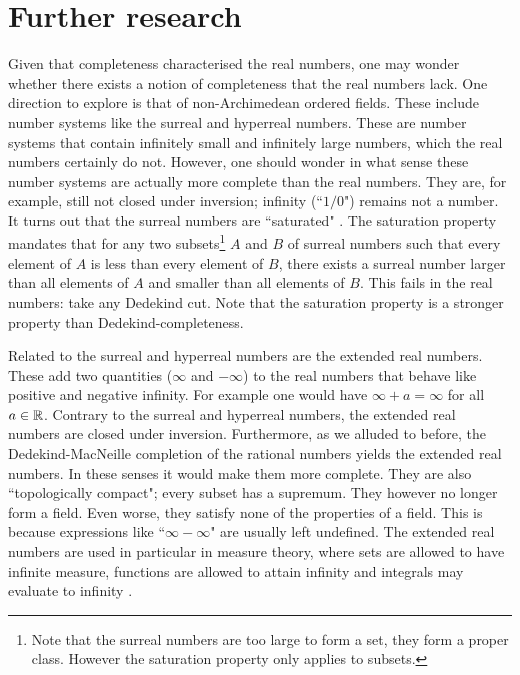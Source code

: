\documentclass[../main.tex]{subfiles}
\begin{document}
\section{Further research}\label{sec:the_real_numbers:further_research}
Given that completeness characterised the real numbers, one may wonder wheth\-er there exists a notion of completeness that the real numbers lack. One direction to explore is that of non-Archimedean ordered fields. These include number systems like the surreal \cite{Conway1976} and hyperreal \cite{Goldblatt1998} numbers. These are number systems that contain infinitely small and infinitely large numbers, which the real numbers certainly do not. However, one should wonder in what sense these number systems are actually more complete than the real numbers. They are, for example, still not closed under inversion; infinity (``$1/0$") remains not a number. It turns out that the surreal numbers are ``saturated" \cite{Michael1963}. The saturation property mandates that for any two subsets\footnote{Note that the surreal numbers are too large to form a set, they form a proper class. However the saturation property only applies to subsets.} $A$ and $B$ of surreal numbers such that every element of $A$ is less than every element of $B$, there exists a surreal number larger than all elements of $A$ and smaller than all elements of $B$. This fails in the real numbers: take any Dedekind cut. Note that the saturation property is a stronger property than Dedekind-completeness.

Related to the surreal and hyperreal numbers are the extended real numbers. These add two quantities ($\infty$ and $-\infty$) to the real numbers that behave like positive and negative infinity. For example one would have $\infty+a=\infty$ for all $a\in\mathbb{R}$. Contrary to the surreal and hyperreal numbers, the extended real numbers are closed under inversion. Furthermore, as we alluded to before, the Dedekind-MacNeille completion of the rational numbers yields the extended real numbers. In these senses it would make them more complete. They are also ``topologically compact"; every subset has a supremum. They however no longer form a field. Even worse, they satisfy none of the properties of a field. This is because expressions like ``$\infty-\infty$" are usually left undefined. The extended real numbers are used in particular in measure theory, where sets are allowed to have infinite measure, functions are allowed to attain infinity and integrals may evaluate to infinity \cite{Veraar2022}.
\end{document}
